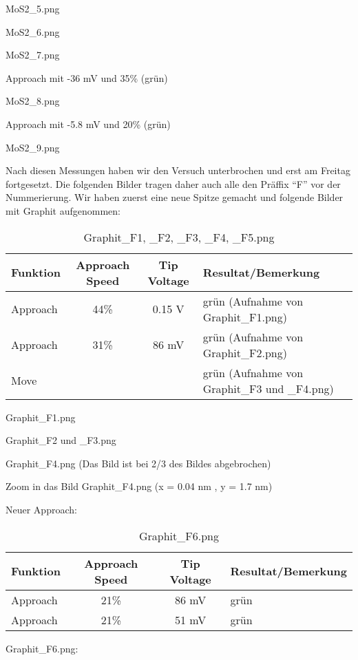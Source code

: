 MoS2\_5.png 

MoS2\_6.png 

MoS2\_7.png 

Approach mit -36 mV und 35\% (grün)

MoS2\_8.png 

Approach mit -5.8 mV und 20\% (grün)

MoS2\_9.png 

Nach diesen Messungen haben wir den Versuch unterbrochen und erst am Freitag fortgesetzt. Die folgenden Bilder tragen daher auch alle den Präffix "`F"' vor der Nummerierung. Wir haben zuerst eine neue Spitze gemacht und folgende Bilder mit Graphit aufgenommen:

\begin{table}[H]
\caption{Graphit\_F1, \_F2, \_F3, \_F4, \_F5.png}
\centering \begin{tabular}[H]{l c c l}
Funktion & Approach Speed & Tip Voltage & Resultat/Bemerkung\\ \hline
Approach & 44\% & 0.15 V & grün (Aufnahme von Graphit\_F1.png)\\
Approach & 31\% & 86 mV & grün (Aufnahme von Graphit\_F2.png)\\
Move & & & grün (Aufnahme von Graphit\_F3 und \_F4.png)
\end{tabular}
\end{table}

Graphit\_F1.png 

Graphit\_F2 und \_F3.png 

Graphit\_F4.png (Das Bild ist bei 2/3 des Bildes abgebrochen) 

Zoom in das Bild Graphit\_F4.png (x = 0.04 nm , y = 1.7 nm) 

Neuer Approach:

\begin{table}[H]
\caption{Graphit\_F6.png}
\centering \begin{tabular}[H]{l c c l}
Funktion & Approach Speed & Tip Voltage & Resultat/Bemerkung\\ \hline
Approach & 21\% & 86 mV & grün\\ 
Approach & 21\% & 51 mV & grün
\end{tabular}
\end{table}

Graphit\_F6.png: 

